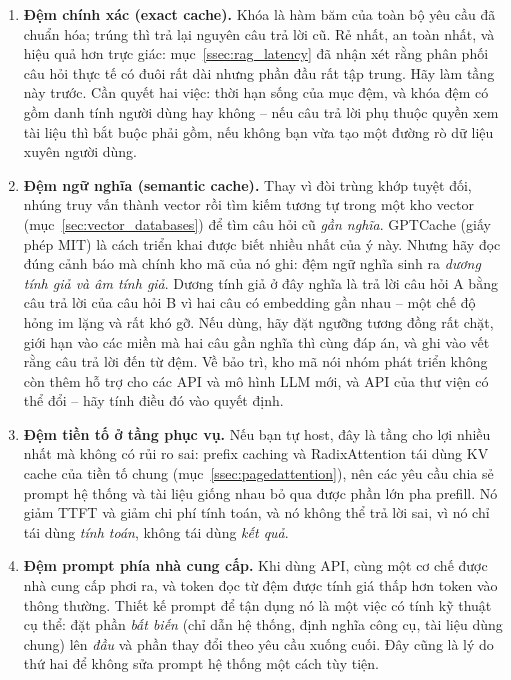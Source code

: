 \begin{enumerate}
	\item \textbf{Đệm chính xác (exact cache).} Khóa là hàm băm của toàn bộ yêu cầu đã chuẩn hóa; trúng thì trả lại nguyên câu trả lời cũ. Rẻ nhất, an toàn nhất, và hiệu quả hơn trực giác: mục~\ref{ssec:rag_latency} đã nhận xét rằng phân phối câu hỏi thực tế có đuôi rất dài nhưng phần đầu rất tập trung. Hãy làm tầng này trước. Cần quyết hai việc: thời hạn sống của mục đệm, và khóa đệm có gồm danh tính người dùng hay không -- nếu câu trả lời phụ thuộc quyền xem tài liệu thì bắt buộc phải gồm, nếu không bạn vừa tạo một đường rò dữ liệu xuyên người dùng.
	\item \textbf{Đệm ngữ nghĩa (semantic cache).} Thay vì đòi trùng khớp tuyệt đối, nhúng truy vấn thành vector rồi tìm kiếm tương tự trong một kho vector (mục~\ref{sec:vector_databases}) để tìm câu hỏi cũ \emph{gần nghĩa}. GPTCache (giấy phép MIT) là cách triển khai được biết nhiều nhất của ý này. Nhưng hãy đọc đúng cảnh báo mà chính kho mã của nó ghi: đệm ngữ nghĩa sinh ra \emph{dương tính giả và âm tính giả}. Dương tính giả ở đây nghĩa là trả lời câu hỏi A bằng câu trả lời của câu hỏi B vì hai câu có embedding gần nhau -- một chế độ hỏng im lặng và rất khó gỡ. Nếu dùng, hãy đặt ngưỡng tương đồng rất chặt, giới hạn vào các miền mà hai câu gần nghĩa thì cùng đáp án, và ghi vào vết rằng câu trả lời đến từ đệm. Về bảo trì, kho mã nói nhóm phát triển không còn thêm hỗ trợ cho các API và mô hình LLM mới, và API của thư viện có thể đổi -- hãy tính điều đó vào quyết định.
	\item \textbf{Đệm tiền tố ở tầng phục vụ.} Nếu bạn tự host, đây là tầng cho lợi nhiều nhất mà không có rủi ro sai: prefix caching và RadixAttention tái dùng KV cache của tiền tố chung (mục~\ref{ssec:pagedattention}), nên các yêu cầu chia sẻ prompt hệ thống và tài liệu giống nhau bỏ qua được phần lớn pha prefill. Nó giảm TTFT và giảm chi phí tính toán, và nó không thể trả lời sai, vì nó chỉ tái dùng \emph{tính toán}, không tái dùng \emph{kết quả}.
	\item \textbf{Đệm prompt phía nhà cung cấp.} Khi dùng API, cùng một cơ chế được nhà cung cấp phơi ra, và token đọc từ đệm được tính giá thấp hơn token vào thông thường. Thiết kế prompt để tận dụng nó là một việc có tính kỹ thuật cụ thể: đặt phần \emph{bất biến} (chỉ dẫn hệ thống, định nghĩa công cụ, tài liệu dùng chung) lên \emph{đầu} và phần thay đổi theo yêu cầu xuống cuối. Đây cũng là lý do thứ hai để không sửa prompt hệ thống một cách tùy tiện.
\end{enumerate}

